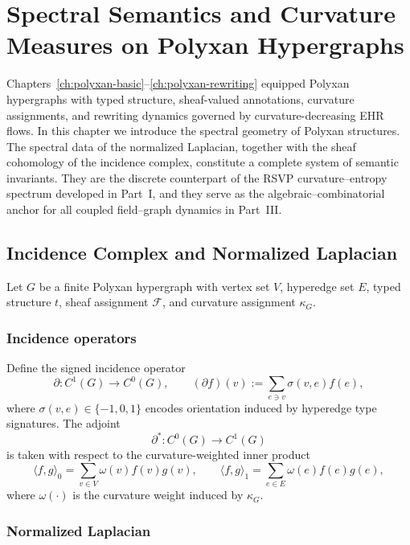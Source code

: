 \chapter{Spectral Semantics and Curvature Measures on Polyxan Hypergraphs}
\label{ch:spectral-semantics}

Chapters~\ref{ch:polyxan-basic}--\ref{ch:polyxan-rewriting} equipped Polyxan
hypergraphs with typed structure, sheaf-valued annotations, curvature
assignments, and rewriting dynamics governed by curvature-decreasing EHR
flows.  
In this chapter we introduce the spectral geometry of Polyxan structures.
The spectral data of the normalized Laplacian, together with the sheaf
cohomology of the incidence complex, constitute a complete system of semantic
invariants.  
They are the discrete counterpart of the RSVP curvature--entropy spectrum
developed in Part~I, and they serve as the algebraic–combinatorial anchor for
all coupled field–graph dynamics in Part~III.

\section{Incidence Complex and Normalized Laplacian}

Let $G$ be a finite Polyxan hypergraph with vertex set $V$, hyperedge set $E$,
typed structure $t$, sheaf assignment $\mathscr{F}$, and curvature assignment
$\kappa_G$.

\subsection{Incidence operators}

Define the signed incidence operator
\[
\partial : C^1(G) \to C^0(G),
\qquad
(\partial f)(v) := \sum_{e \ni v} \sigma(v,e) f(e),
\]
where $\sigma(v,e) \in \{-1,0,1\}$ encodes orientation induced by
hyperedge type signatures.  
The adjoint
\[
\partial^\ast : C^0(G) \to C^1(G)
\]
is taken with respect to the curvature-weighted inner product
\[
\langle f,g\rangle_0 = \sum_{v\in V} \omega(v) f(v) g(v),
\qquad
\langle f,g\rangle_1 = \sum_{e\in E} \omega(e) f(e) g(e),
\]
where $\omega(\cdot)$ is the curvature weight induced by $\kappa_G$.

\subsection{Normalized Laplacian}

